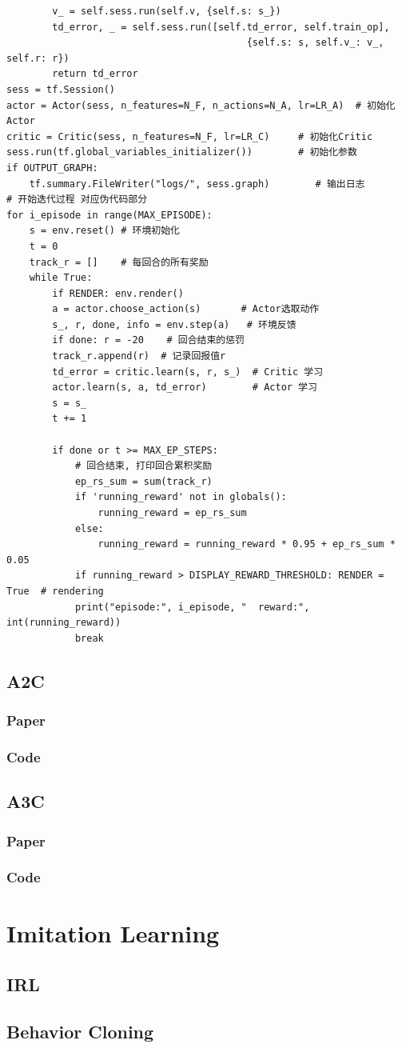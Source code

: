 \documentclass{book}
\begin{document}
\begin{lstlisting}
        v_ = self.sess.run(self.v, {self.s: s_})
        td_error, _ = self.sess.run([self.td_error, self.train_op],
                                          {self.s: s, self.v_: v_, self.r: r})
        return td_error
sess = tf.Session()
actor = Actor(sess, n_features=N_F, n_actions=N_A, lr=LR_A)  # 初始化Actor
critic = Critic(sess, n_features=N_F, lr=LR_C)     # 初始化Critic
sess.run(tf.global_variables_initializer())        # 初始化参数
if OUTPUT_GRAPH:
    tf.summary.FileWriter("logs/", sess.graph)        # 输出日志
# 开始迭代过程 对应伪代码部分
for i_episode in range(MAX_EPISODE):
    s = env.reset() # 环境初始化
    t = 0
    track_r = []    # 每回合的所有奖励
    while True:
        if RENDER: env.render()
        a = actor.choose_action(s)       # Actor选取动作
        s_, r, done, info = env.step(a)   # 环境反馈
        if done: r = -20    # 回合结束的惩罚
        track_r.append(r)  # 记录回报值r
        td_error = critic.learn(s, r, s_)  # Critic 学习
        actor.learn(s, a, td_error)        # Actor 学习
        s = s_
        t += 1

        if done or t >= MAX_EP_STEPS:
            # 回合结束, 打印回合累积奖励
            ep_rs_sum = sum(track_r)
            if 'running_reward' not in globals():
                running_reward = ep_rs_sum
            else:
                running_reward = running_reward * 0.95 + ep_rs_sum * 0.05
            if running_reward > DISPLAY_REWARD_THRESHOLD: RENDER = True  # rendering
            print("episode:", i_episode, "  reward:", int(running_reward))
            break
\end{lstlisting}
\section{A2C}
\subsection{Paper}
\subsection{Code}
\section{A3C}
\subsection{Paper}
\subsection{Code}
\chapter{Imitation Learning}
\section{IRL}
\section{Behavior Cloning}
\end{document}
